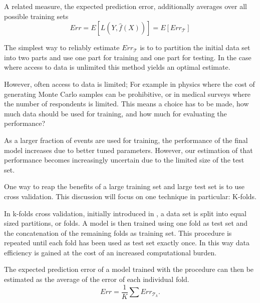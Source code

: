 A related measure, the expected prediction error, additionally averages over all possible training sets
\begin{equation}
Err = E\left[L(Y, \hat{f}(X))\right] = E\left[Err_{\mathcal{T}}\right]
\end{equation}

The simplest way to reliably estimate $Err_{\mathcal{T}}$ is to to partition the initial data set into two parts and use one part for training and one part for testing. In the case where access to data is unlimited this method yields an optimal estimate.

However, often access to data is limited; For example in physics where the cost of generating Monte Carlo samples can be prohibitive, or in medical surveys where the number of respondents is limited. This means a choice has to be made, how much data should be used for training, and how much for evaluating the performance?

As a larger fraction of events are used for training, the performance of the final model increases due to better tuned parameters. However, our estimation of that performance becomes increasingly uncertain due to the limited size of the test set.

One way to reap the benefits of a large training set and large test set is to use cross validation. This discussion will focus on one technique in particular: K-folds.

In k-folds cross validation, initially introduced in \cite{k-folds}, a data set is split into equal sized partitions, or folds. A model is then trained using one fold as test set and the concatenation of the remaining folds as training set. This procedure is repeated until each fold has been used as test set exactly once. In this way data efficiency is gained at the cost of an increased computational burden.

The expected prediction error of a model trained with the procedure can then be estimated as the average of the error of each individual fold.
\begin{equation}
   Err = \frac{1}{K} \sum Err_{\mathcal{T}_k}.
\end{equation}









